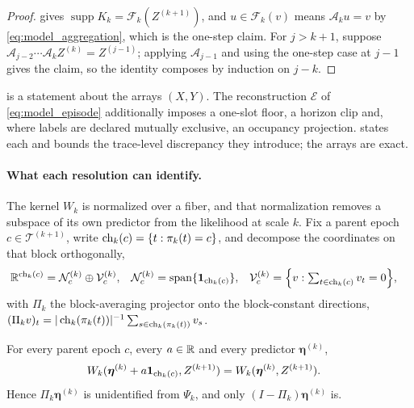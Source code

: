 \begin{proof}
 gives \(\operatorname{supp}K_k=\mathcal
F_k(Z^{(k+1)})\), and \(u\in\mathcal F_k(v)\) means \(\mathcal A_ku=v\) by
\cref{eq:model_aggregation}, which is the one-step claim. For \(j>k+1\),
suppose \(\mathcal A_{j-2}\cdots\mathcal A_kZ^{(k)}=Z^{(j-1)}\); applying
\(\mathcal A_{j-1}\) and using the one-step case at \(j-1\) gives the claim, so
the identity composes by induction on \(j-k\).
\end{proof}

 is a statement about the arrays \((X,Y)\). The
reconstruction \(\mathcal E\) of \cref{eq:model_episode} additionally imposes a
one-slot floor, a horizon clip and, where labels are declared mutually
exclusive, an occupancy projection.  states each and
bounds the trace-level discrepancy they introduce; the arrays are exact.

\paragraph{What each resolution can identify.}
\label{sec:model_blockconstant}

The kernel \(W_k\) is normalized over a fiber, and that normalization removes a
subspace of its own predictor from the likelihood at scale \(k\). Fix a parent
epoch \(c\in\mathcal T^{(k+1)}\), write \(\operatorname{ch}_k(c)=\{t:\pi_k(t)=c\}\), and
decompose the coordinates on that block orthogonally,
\begin{align}
 {\mathbb{R}}^{\operatorname{ch}_k(c)}
 &=\mathcal N_c^{(k)}\oplus\mathcal V_c^{(k)},
 &\mathcal N_c^{(k)}&=\operatorname{span}\{\mathbf 1_{\operatorname{ch}_k(c)}\},
 &\mathcal V_c^{(k)}&=\Bigl\{v:\textstyle\sum_{t\in\operatorname{ch}_k(c)}v_t=0\Bigr\},
 \label{eq:model_block_split}
\end{align}
with \(\Pi_k\) the block-averaging projector onto the block-constant
directions,
\((\Pi_kv)_t=|\operatorname{ch}_k(\pi_k(t))|^{-1}\sum_{s\in\operatorname{ch}_k(\pi_k(t))}v_s\).

\begin{proposition}
\label{prop:model_block_invariance}
For every parent epoch \(c\), every \(a\in{\mathbb{R}}\) and every predictor
\(\boldsymbol\eta^{(k)}\),
\begin{align}
 W_k(\boldsymbol\eta^{(k)}+a\mathbf 1_{\operatorname{ch}_k(c)},Z^{(k+1)})
 &=W_k(\boldsymbol\eta^{(k)},Z^{(k+1)}).
 \label{eq:model_block_invariance}
\end{align}
Hence \(\Pi_k\boldsymbol\eta^{(k)}\) is unidentified from \(\Psi_k\), and only
\((I-\Pi_k)\boldsymbol\eta^{(k)}\) is.
\end{proposition}

